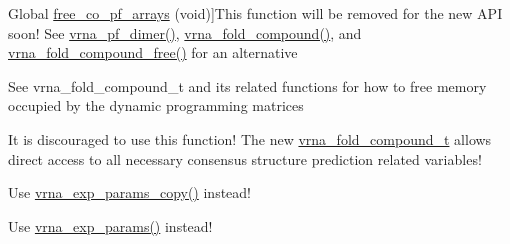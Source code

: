 \begin{DoxyRefList}
Global \mbox{\hyperlink{part__func__co_8h_ade3ce34ae8214811374b1d28a40dc247}{free\+\_\+co\+\_\+pf\+\_\+arrays}} (void)]This function will be removed for the new A\+PI soon! See \mbox{\hyperlink{group__pf__cofold_ga4e5c7d06c302a7c59fc0d64dc142ca63}{vrna\+\_\+pf\+\_\+dimer()}}, \mbox{\hyperlink{group__fold__compound_ga6601d994ba32b11511b36f68b08403be}{vrna\+\_\+fold\+\_\+compound()}}, and \mbox{\hyperlink{group__fold__compound_gadded6039d63f5d6509836e20321534ad}{vrna\+\_\+fold\+\_\+compound\+\_\+free()}} for an alternative  
\item[\label{deprecated__deprecated000106}%
\Hypertarget{deprecated__deprecated000106}%
Global \mbox{\hyperlink{group__pf__fold_gae73db3f49a94f0f72e067ecd12681dbd}{free\+\_\+pf\+\_\+arrays}} (void)]See vrna\+\_\+fold\+\_\+compound\+\_\+t and its related functions for how to free memory occupied by the dynamic programming matrices 
\item[\label{deprecated__deprecated000024}%
\Hypertarget{deprecated__deprecated000024}%
Global \mbox{\hyperlink{group__consensus__fold_ga5349960075b1847720a2e9df021e2675}{get\+\_\+alipf\+\_\+arrays}} (short $\ast$$\ast$$\ast$\+S\+\_\+p, short $\ast$$\ast$$\ast$\+S5\+\_\+p, short $\ast$$\ast$$\ast$\+S3\+\_\+p, unsigned short $\ast$$\ast$$\ast$a2s\+\_\+p, char $\ast$$\ast$$\ast$\+Ss\+\_\+p, F\+L\+T\+\_\+\+O\+R\+\_\+\+D\+BL $\ast$$\ast$qb\+\_\+p, F\+L\+T\+\_\+\+O\+R\+\_\+\+D\+BL $\ast$$\ast$qm\+\_\+p, F\+L\+T\+\_\+\+O\+R\+\_\+\+D\+BL $\ast$$\ast$q1k\+\_\+p, F\+L\+T\+\_\+\+O\+R\+\_\+\+D\+BL $\ast$$\ast$qln\+\_\+p, short $\ast$$\ast$pscore)]It is discouraged to use this function! The new \mbox{\hyperlink{group__fold__compound_ga1b0cef17fd40466cef5968eaeeff6166}{vrna\+\_\+fold\+\_\+compound\+\_\+t}} allows direct access to all necessary consensus structure prediction related variables! 
\item[\label{deprecated__deprecated000096}%
\Hypertarget{deprecated__deprecated000096}%
Global \mbox{\hyperlink{group__energy__parameters_ga665a446ba8ff211e551297a8fa36ec27}{get\+\_\+boltzmann\+\_\+factor\+\_\+copy}} (vrna\+\_\+exp\+\_\+param\+\_\+t $\ast$parameters)]Use \mbox{\hyperlink{group__energy__parameters_ga70bc46be7cfa5434a71efe241c4f0609}{vrna\+\_\+exp\+\_\+params\+\_\+copy()}} instead! 
\item[\label{deprecated__deprecated000095}%
\Hypertarget{deprecated__deprecated000095}%
Global \mbox{\hyperlink{group__energy__parameters_gaef2b931c7e9d4ffb0a5c33df50ec2068}{get\+\_\+boltzmann\+\_\+factors}} (double temperature, double beta\+Scale, vrna\+\_\+md\+\_\+t md, double pf\+\_\+scale)]Use \mbox{\hyperlink{group__energy__parameters_gab1f3016f96aa96bff020cdd904605afa}{vrna\+\_\+exp\+\_\+params()}} instead! 
$$
\end{DoxyRefList}
